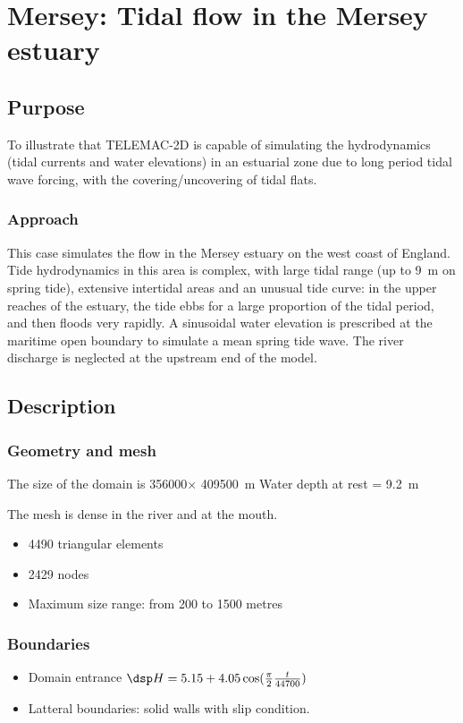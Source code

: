 \chapter{Mersey: Tidal flow in the Mersey estuary}
\section{Purpose}
To illustrate that TELEMAC-2D is capable of simulating the hydrodynamics
(tidal currents and water elevations) in an estuarial zone due to long
period tidal wave forcing, with the covering/uncovering of tidal flats.

\subsection{Approach}
This case simulates the flow in the Mersey estuary on the west coast of
England. Tide hydrodynamics in this area is complex, with large tidal
range (up to 9~m on spring tide), extensive intertidal areas and an unusual
tide curve: in the upper reaches of the estuary, the tide ebbs for a large
proportion of the tidal period, and then floods very rapidly.
A sinusoidal water elevation is prescribed at the maritime open boundary
to simulate a mean spring tide wave.
The river discharge is neglected at the upstream end of the model.

\section{Description}

\subsection{Geometry and mesh}
The size of the domain is 356000$\times$ 409500~m
Water depth at rest = 9.2~m

The mesh is dense in the river and at the mouth.
\begin{itemize}
\item 4490 triangular elements
\item 2429 nodes
\item Maximum size range: from 200 to 1500 metres
\end{itemize}

\subsection{Boundaries}
\begin{itemize}
\item Domain entrance $\dsp H=5.15+4.05\cos(\frac{\pi}{2}\frac{t}{44700}) $
\item Latteral boundaries: solid walls with slip condition.
\end{itemize}


